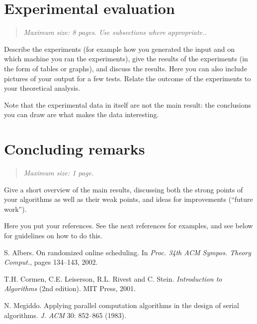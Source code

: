 \documentclass[11pt]{article}
\newcommand{\maxsize}[1]{\begin{quotation} {\sl \noindent Maximum size: #1.} \end{quotation}}
\begin{document}
\section{Experimental evaluation}
\label{se:evaluation}
\maxsize{8 pages. Use subsections where appropriate.}
Describe the experiments (for example how you generated the input and on which machine you
ran the experiments), give the results of the experiments (in the form of tables or graphs),
and discuss the results. Here you can also include pictures of your output for a few tests.
Relate the outcome of the experiments to your theoretical analysis.

Note that the experimental data in itself are not the main result: the conclusions
you can draw are what makes the data interesting.



\section{Concluding remarks}
\label{se:conclusions}
\maxsize{1 page}
Give a short overview of the main results, discussing both the strong
points of your algorithms as well as their weak points, and ideas for improvements
(``future work'').




\begin{thebibliography}{}

\bibitem{} Here you put your references. See the next references for examples, and see below
for guidelines on how to do this.

S. Albers.
On randomized online scheduling.
In \emph{Proc. 34th ACM Sympos. Theory Comput.}, pages 134--143, 2002.

T.H. Cormen, C.E. Leiserson, R.L. Rivest and C. Stein.
\emph{Introduction to Algorithms} (2nd edition).
MIT Press, 2001.

N. Megiddo.
Applying parallel computation algorithms in the design of serial algorithms.
\emph{J. ACM} 30: 852--865 (1983).

\end{thebibliography}
\end{document}
